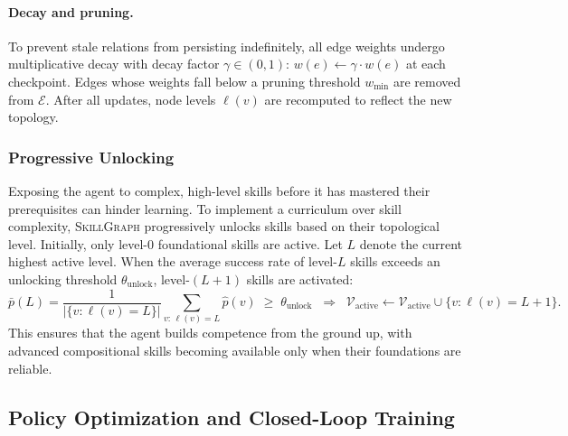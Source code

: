\paragraph{Decay and pruning.} To prevent stale relations from persisting indefinitely, all edge weights undergo multiplicative decay with decay factor $\gamma \in (0, 1)$: $w(e) \leftarrow \gamma \cdot w(e)$ at each checkpoint. Edges whose weights fall below a pruning threshold $w_{\min}$ are removed from $\mathcal{E}$. After all updates, node levels $\ell(v)$ are recomputed to reflect the new topology.

\subsubsection{Progressive Unlocking}
\label{sec:unlocking}

Exposing the agent to complex, high-level skills before it has mastered their prerequisites can hinder learning. To implement a curriculum over skill complexity, \textsc{SkillGraph} progressively unlocks skills based on their topological level. Initially, only level-0 foundational skills are active. Let $L$ denote the current highest active level. When the average success rate of level-$L$ skills exceeds an unlocking threshold $\theta_{\text{unlock}}$, level-$(L{+}1)$ skills are activated:
\begin{equation}
    \bar{p}(L) = \frac{1}{|\{v : \ell(v) = L\}|} \sum_{v:\, \ell(v) = L} \hat{p}(v) \;\geq\; \theta_{\text{unlock}} \;\;\Longrightarrow\;\; \mathcal{V}_{\text{active}} \leftarrow \mathcal{V}_{\text{active}} \cup \{v : \ell(v) = L+1\}.
    \label{eq:unlock}
\end{equation}
This ensures that the agent builds competence from the ground up, with advanced compositional skills becoming available only when their foundations are reliable.

\subsection{Policy Optimization and Closed-Loop Training}
\label{sec:training}

